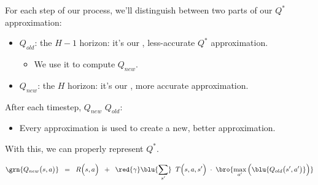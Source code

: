         \begin{notation}
            For each step of our  process, we'll distinguish between two parts of our $Q^*$ approximation:

            \begin{itemize}
                \item $Q_{old}$: the $H-1$ horizon: it's our , less-accurate $Q^*$ approximation. 
                    \begin{itemize}
                        \item We use it to compute $Q_{new}$.
                    \end{itemize}

                \item $Q_{new}$: the $H$ horizon: it's our , more accurate approximation.
                
            \end{itemize}

            \subsecdiv

            After each timestep, $Q_{new}$  $Q_{old}$:

            \begin{itemize}
                \item Every approximation is used to create a new, better approximation. 
            \end{itemize}
        \end{notation}

        With this, we can properly represent $Q^*$.

        \begin{equation}
            \grn{Q_{new}\big(s,a \big)} \;\;=\;\; 
                    R \Big( s,a \Big)
                \;\;+\;\;
                    \red{\gamma}
                    \blu{\sum_{s'}}  
                        \;\;
                        T \Big(          s,a,s' \Big)
                        \;\cdot\; 
                        \bro{ \max_{a'} \Big( \blu{Q_{old}\big(s',a' \big)} \Big)}
        \end{equation}

